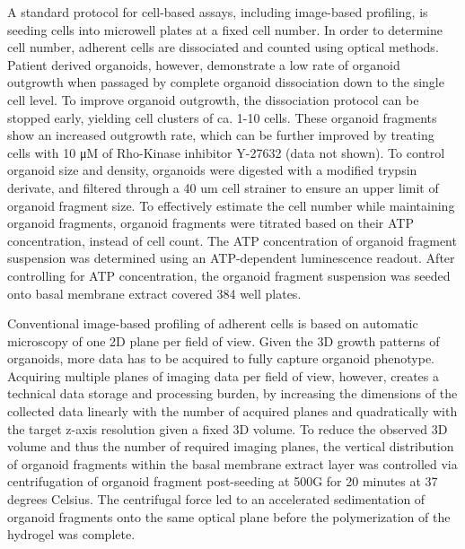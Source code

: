 \begin{flushleft}
A standard protocol for cell-based assays, including image-based profiling, is seeding cells into microwell plates at a fixed cell number. In order to determine cell number, adherent cells are dissociated and counted using optical methods. Patient derived organoids, however, demonstrate a low rate of organoid outgrowth when passaged by complete organoid dissociation down to the single cell level. To improve organoid outgrowth, the dissociation protocol can be stopped early, yielding cell clusters of ca. 1-10 cells. These organoid fragments show an increased outgrowth rate, which can be further improved by treating cells with 10 μM of Rho-Kinase inhibitor Y-27632 (data not shown). To control organoid size and density, organoids were digested with a modified trypsin derivate, and filtered through a 40 um cell strainer to ensure an upper limit of organoid fragment size. To effectively estimate the cell number while maintaining organoid fragments, organoid fragments were titrated based on their ATP concentration, instead of cell count. The ATP concentration of organoid fragment suspension was determined using an ATP-dependent luminescence readout. After controlling for ATP concentration, the organoid fragment suspension was seeded onto basal membrane extract covered 384 well plates.

\bigbreak

Conventional image-based profiling of adherent cells is based on automatic microscopy of one 2D plane per field of view. Given the 3D growth patterns of organoids, more data has to be acquired to fully capture organoid phenotype. Acquiring multiple planes of imaging data per field of view, however, creates a technical data storage and processing burden, by increasing the dimensions of the collected data linearly with the number of acquired planes and quadratically with the target z-axis resolution given a fixed 3D volume. To reduce the observed 3D volume and thus the number of required imaging planes, the vertical distribution of organoid fragments within the basal membrane extract layer was controlled via centrifugation of organoid fragment post-seeding at 500G for 20 minutes at 37 degrees Celsius. The centrifugal force led to an accelerated sedimentation of organoid fragments onto the same optical plane before the polymerization of the hydrogel was complete.

\bigbreak


\end{flushleft}
